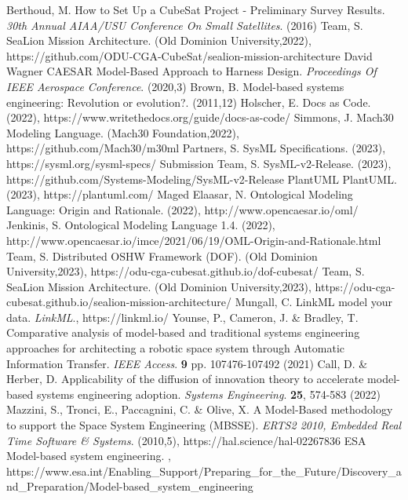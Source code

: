 \begin{thebibliography}{999}
    Berthoud, M. How to Set Up a CubeSat Project - Preliminary Survey Results. {\em 30th Annual AIAA/USU Conference On Small Satellites}. (2016)
    Team, S. SeaLion Mission Architecture. (Old Dominion University,2022), https://github.com/ODU-CGA-CubeSat/sealion-mission-architecture
    David Wagner CAESAR Model-Based Approach to Harness Design. {\em Proceedings Of IEEE Aerospace Conference}. (2020,3)
    Brown, B. Model-based systems engineering: Revolution or evolution?.  (2011,12)
    Holscher, E. Docs as Code.  (2022), https://www.writethedocs.org/guide/docs-as-code/
    Simmons, J. Mach30 Modeling Language. (Mach30 Foundation,2022), https://github.com/Mach30/m30ml
    Partners, S. SysML Specifications.  (2023), https://sysml.org/sysml-specs/
    Submission Team, S. SysML-v2-Release.  (2023), https://github.com/Systems-Modeling/SysML-v2-Release
    PlantUML PlantUML.  (2023), https://plantuml.com/
    Maged Elaasar, N. Ontological Modeling Language: Origin and Rationale.  (2022), http://www.opencaesar.io/oml/
    Jenkinis, S. Ontological Modeling Language 1.4.  (2022), http://www.opencaesar.io/imce/2021/06/19/OML-Origin-and-Rationale.html
    Team, S. Distributed OSHW Framework (DOF). (Old Dominion University,2023), https://odu-cga-cubesat.github.io/dof-cubesat/
    Team, S. SeaLion Mission Architecture. (Old Dominion University,2023), https://odu-cga-cubesat.github.io/sealion-mission-architecture/
    Mungall, C. LinkML model your data. {\em LinkML}., https://linkml.io/
    Younse, P., Cameron, J. \& Bradley, T. Comparative analysis of model-based and traditional systems engineering approaches for architecting a robotic space system through Automatic Information Transfer. {\em IEEE Access}. \textbf{9} pp. 107476-107492 (2021)
    Call, D. \& Herber, D. Applicability of the diffusion of innovation theory to accelerate model-based systems engineering adoption. {\em Systems Engineering}. \textbf{25}, 574-583 (2022)
    Mazzini, S., Tronci, E., Paccagnini, C. \& Olive, X. A Model-Based methodology to support the Space System Engineering (MBSSE). {\em ERTS2 2010, Embedded Real Time Software \& Systems}. (2010,5), https://hal.science/hal-02267836
    ESA Model-based system engineering. , https://www.esa.int/Enabling\_Support/Preparing\_for\_the\_Future/Discovery\_and\_Preparation/Model-based\_system\_engineering

\end{thebibliography}
